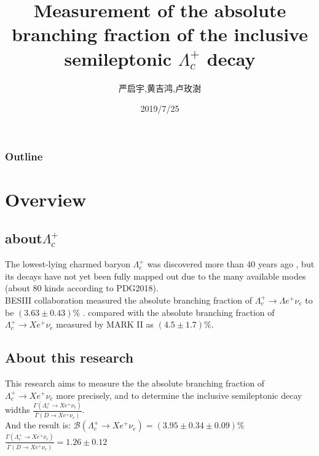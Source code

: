\documentclass{beamer}
\title{Measurement of the absolute branching fraction of the inclusive semileptonic $\Lambda_c^+$ decay}
\author{严启宇,黄吉鸿,卢玫澍}
\institute{UCAS}
\date{2019/7/25}
\begin{document}

\begin{frame}
    \titlepage
\end{frame}

\begin{frame}
    \frametitle{Outline}
    \tableofcontents
\end{frame}

\section{Overview}
\subsection{about$\Lambda_c^+$}
\begin{frame}
    \sectionpage
\end{frame}

\begin{frame}
    The lowest-lying charmed baryon $\Lambda_c^+$ was discovered more than 40 years ago\cite{knapp1976observation}\cite{abrams1980observation} , but its
    decays have not yet been fully mapped out due to the many available modes (about 80 kinds according to PDG2018). \\
    \vspace{0.2in}
    BESIII collaboration measured the absolute branching fraction of $\Lambda_c^+ \rightarrow \Lambda e^+ \nu_e$ to be $(3.63 \pm 0.43)\%$ \cite{ablikim2015measurement}.
    compared with the absolute branching fraction of $\Lambda_c^+ \rightarrow X e^+ \nu_e$ measured by MARK II as $(4.5 \pm 1.7)\%$.\cite{vella1982observation}

\end{frame}
\subsection{About this research}
\begin{frame}
    This research \cite{ablikim2018measurement} aims to measure the the absolute branching fraction of $\Lambda_c^+ \rightarrow X e^+ \nu_e$ more precisely, and to determine
    the inclusive semileptonic decay widths $\frac{\Gamma(\Lambda_c^+ \rightarrow X e^+ \nu_e)}{\bar{\Gamma}(D\rightarrow X e^+ \nu_e)}$.\\
    \vspace{0.2in}
    And the result is: $\mathcal{B}(\Lambda_c^+ \rightarrow X e^+ \nu_e) = (3.95\pm0.34\pm0.09)\%$ \\ $\frac{\Gamma(\Lambda_c^+ \rightarrow X e^+ \nu_e)}{\bar{\Gamma}(D\rightarrow X e^+ \nu_e)}=1.26\pm0.12$
\end{frame}
\end{document}
